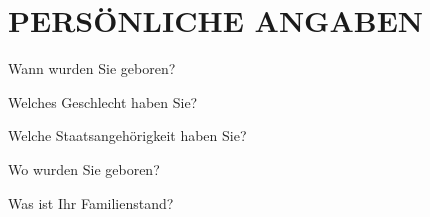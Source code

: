 
\section{\uppercase{Persönliche Angaben}}
\vspace{-.15cm}

\begin{choicequestion}[6]{Wann wurden Sie geboren?}
\end{choicequestion}

\vspace{-.15cm}
\separate
\vspace{-.15cm}

\begin{choicequestion}[1]{Welches Geschlecht haben Sie?}
\end{choicequestion}

\vspace{-.15cm}
\separate
\vspace{-.15cm}

\begin{choicequestion}[4]{Welche Staatsangehörigkeit haben Sie?}
	 \\
\end{choicequestion}

\vspace{-.15cm}
\separate
\vspace{-.15cm}

\begin{choicequestion}[4]{Wo wurden Sie geboren?}
	 \\
\end{choicequestion}

\vspace{-.15cm}
\separate
\vspace{-.15cm}

\begin{choicequestion}[1]{Was ist Ihr Familienstand?}
\end{choicequestion}

\vspace{-.15cm}
\separate
\vspace{-.15cm}

